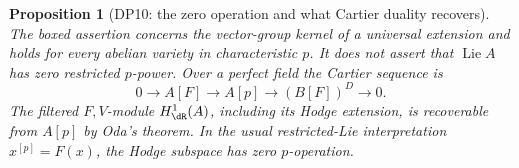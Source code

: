 \documentclass[11pt,a4paper]{article}
\newtheorem{proposition}[theorem]{Proposition}
\theoremstyle{definition}\newtheorem{remark}[theorem]{Remark}
\newcommand{\Lie}{\operatorname{Lie}}\newcommand{\Dist}{\operatorname{Dist}}
\begin{document}
\begin{proposition}[DP10: the zero operation and what Cartier duality recovers]\label{DP10}
The boxed assertion concerns the vector-group kernel of a universal extension and holds for every abelian variety in characteristic $p$. It does not assert that $\Lie A$ has zero restricted $p$-power. Over a perfect field the Cartier sequence is
\begin{equation}\label{eq:cartier}
 0\longrightarrow A[F]\longrightarrow A[p]
 \longrightarrow (B[F])^D\longrightarrow0.
\end{equation}
The filtered $F,V$-module $H^1_\dR(A)$, including its Hodge extension, is recoverable from $A[p]$ by Oda's theorem. In the usual restricted-Lie interpretation $x^{[p]}=F(x)$, the Hodge subspace has zero $p$-operation.
\end{proposition}
\end{document}
